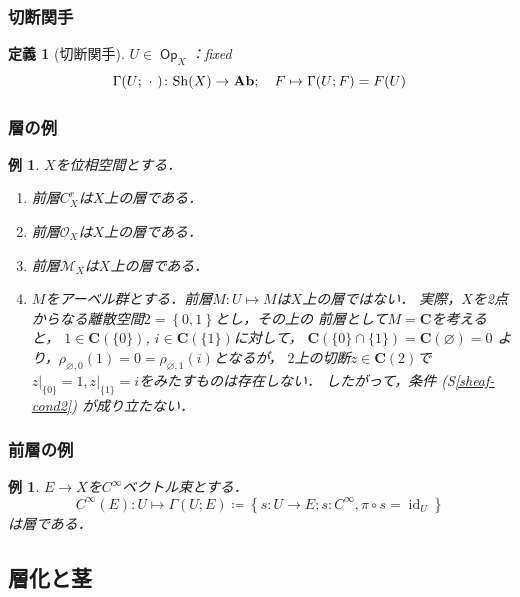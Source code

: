 \documentclass[dvipdfmx,12pt,aspectratio=169,leqno]{beamer}%
\newcommand{\cc}{\mathbf{C}}
\newcommand{\Ab}{{\bf Ab}}
\numberwithin{equation}{subsection}
\newcommand{\Op}{\mathop{\textsf{Op}}\nolimits}
\newcommand{\id}{\mathop{\mathrm{id}}\nolimits}
\newcommand{\Sh}{\mathrm{Sh}}
\newcommand{\blk}{\mathord{\ \cdot\ }}
\theoremstyle{mystyle}
\newtheorem{DFN}[AXM]{定義}
\newtheorem{EG}[AXM]{例}
\begin{document}
\begin{frame}
    \frametitle{切断関手}

    \begin{DFN}[切断関手]
        \(U\in\Op_{X}\)：fixed
        \[
            \Gamma(U;\blk)\colon \Sh(X)\to \Ab;\quad F\mapsto
            \Gamma(U;F)=F(U)
        \]
    \end{DFN}    
\end{frame}



\begin{frame}
    \frametitle{層の例}
    \begin{EG}\label{eg:sheaf}
        \(X\)を位相空間とする．
        \begin{enumerate}
            \item 前層\(C_X^r\)は\(X\)上の層である．
            \item 前層\(\mathscr{O}_X\)は\(X\)上の層である．
            \item 前層\(\mathscr{M}_X\)は\(X\)上の層である．
            \item \(M\)をアーベル群とする．前層\(M\colon U\mapsto M\)は\(X\)上の層ではない．
            実際，\(X\)を2点からなる離散空間\(2=\left\{0,1\right\}\)とし，その上の
            前層として\(M=\cc\)を考えると，
            \(1\in\cc(\{0\})\), \(i\in\cc(\{1\})\)に対して，
            \(\cc(\{0\}\cap\{1\})=\cc(\varnothing)=0\)
            より，\(\rho_{\varnothing,{0}}(1)=0
            =\rho_{\varnothing,{1}}(i)\)となるが，
            \(2\)上の切断\(z\in\cc(2)\)で\(z\rvert_{\{0\}}=1,
            z\rvert_{\{1\}}=i\)をみたすものは存在しない．
            したがって，条件 (S\ref{sheaf-cond2}) が成り立たない．\label{eg:non-sheaf}
        \end{enumerate}
    \end{EG}    
\end{frame}

\begin{frame}
    \frametitle{前層の例}
    \begin{EG}
        \(E\to X\)を\(C^{\infty}\)ベクトル束とする．
        \[
            C^{\infty}(E)\colon U\mapsto \Gamma(U;E)\coloneqq
            \left\{s\colon U\to E;s\colon C^{\infty}, \pi\circ s=\id_U\right\}
        \]は層である．
    \end{EG}
\end{frame}


\subsection{層化と茎}
\end{document}
